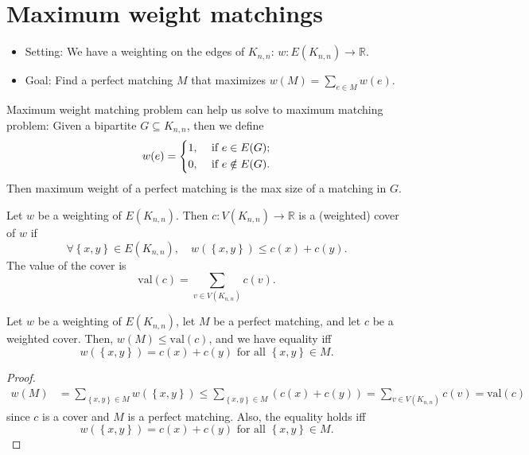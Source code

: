 \section{Maximum weight matchings}
\begin{itemize}
    \item Setting: We have a weighting on the edges of \(K_{n, n}\): \(w: E(K_{n, n}) \to \mathbb{R}\).
    \item Goal: Find a perfect matching \(M\) that maximizes \(w(M) = \sum_{e \in M} w(e) \).  
\end{itemize}

Maximum weight matching problem can help us solve to maximum matching problem: Given a bipartite \(G \subseteq K_{n, n}\), then we define 
\[
    w(e) = \begin{dcases}
        1, &\text{ if } e \in E(G) ;\\
        0, &\text{ if } e \notin E(G) .
    \end{dcases}
\] 
Then maximum weight of a perfect matching is the max size of a matching in \(G\). 

\begin{definition}[Duality]
    Let \(w\) be a weighting of \(E(K_{n, n})\). Then \(c: V(K_{n, n}) \to \mathbb{R}\) is a (weighted) cover of \(w\) if 
    \[
        \forall \left\{ x, y \right\} \in E(K_{n, n}), \quad w(\left\{ x, y \right\} ) \le c(x ) + c(y). 
    \] 
    The value of the cover is 
    \[
        \mathrm{val}(c) = \sum_{v \in V(K_{n, n})} c(v).  
    \]   
\end{definition}

\begin{proposition}
    Let \(w\) be a weighting of \(E(K_{n, n})\), let \(M\) be a perfect matching, and let \(c\) be a weighted cover. Then, \(w(M) \le \mathrm{val}(c) \), and we have equality iff 
    \[
        w(\left\{ x, y \right\} ) = c(x ) + c(y ) \text{ for all } \left\{ x, y \right\} \in M.  
    \]     
\end{proposition}

\begin{proof}
    \begin{align*}
        w(M) &= \sum_{\left\{ x, y \right\} \in M } w(\left\{ x, y \right\} ) \le \sum_{\left\{ x, y \right\} \in M} (c(x) + c(y)) = \sum_{v \in V(K_{n, n})} c(v) = \mathrm{val}(c)   
    \end{align*}
    since \(c\) is a cover and \(M\) is a perfect matching. Also, the equality holds iff
    \[
        w(\left\{ x, y \right\} ) = c(x) + c(y) \text{ for all } \left\{ x, y \right\} \in M.  
    \]   
\end{proof}

